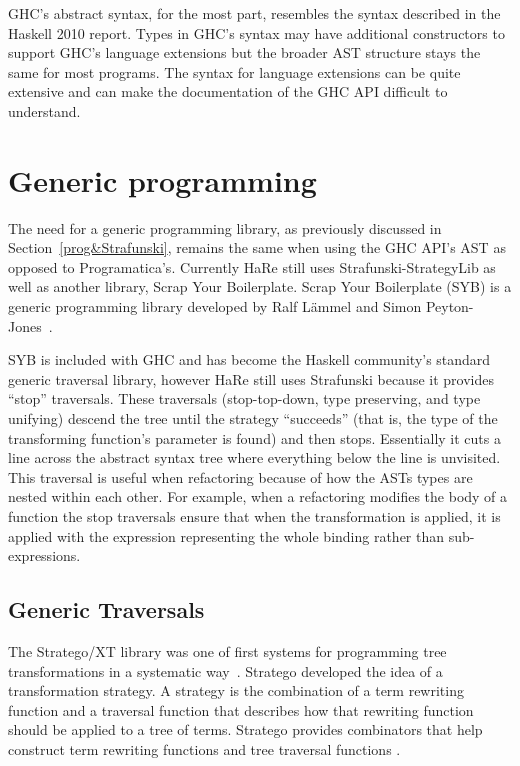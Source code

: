 GHC's abstract syntax, for the most part, resembles the syntax described in the Haskell 2010 report. Types in GHC's syntax may have additional constructors to support GHC's language extensions but the broader AST structure stays the same for most programs. The syntax for language extensions can be quite extensive and can make the documentation of the GHC API difficult to understand.

\section{Generic programming}
\label{genProg}

The need for a generic programming library, as previously discussed in Section~\ref{prog&Strafunski}, remains the same when using the GHC API's AST as opposed to Programatica's. Currently HaRe still uses Strafunski-StrategyLib as well as another library, Scrap Your Boilerplate. Scrap Your Boilerplate (SYB) is a generic programming library developed by Ralf L{\"a}mmel and Simon Peyton-Jones~\citep{syb}. 

SYB is included with GHC and has become the Haskell community's standard generic traversal library, however HaRe still uses Strafunski because it provides ``stop'' traversals. These traversals (stop-top-down, type preserving, and type unifying) descend the tree until the strategy ``succeeds'' (that is, the type of the transforming function's parameter is found) and then stops. Essentially it cuts a line across the abstract syntax tree where everything below the line is unvisited. This traversal is useful when refactoring because of how the ASTs types are nested within each other. For example, when a refactoring modifies the body of a function the stop traversals ensure that when the transformation is applied, it is applied with the expression representing the whole binding rather than sub-expressions.

\subsection{Generic Traversals}
The Stratego/XT library was one of first systems for programming tree transformations in a systematic way~\citep{stratego}. Stratego developed the idea of a transformation strategy. A strategy is the combination of a term rewriting function and a traversal function that describes how that rewriting function should be applied to a tree of terms. Stratego provides combinators that help construct term rewriting functions and tree traversal functions \citep{stratego}.

